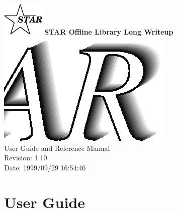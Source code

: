 \documentclass[twoside]{article}
\begin{document}
%
%
\begin{titlepage}
\pagestyle{empty}
\vspace*{-35mm}
\begin{center}
  \mbox{\includegraphics[width=2cm]{StarIcon.eps}}
  {\Large\bf STAR Offline Library Long Writeup}
  \hfill\mbox{}\\[3cm]
  \mbox{\includegraphics[width=\textwidth]{StarClassLibraryTitle.eps}}
  \hfill\mbox{}\\[3cm]
  {\LARGE User Guide and Reference Manual}\\[2cm]
  {\LARGE $ $Revision: 1.10 $ $}  \\[5mm] %
  {\LARGE $ $Date: 1999/09/29 16:54:46 $ $}  %
  \vfill
\end{center}
\cleardoublepage
\end{titlepage}

%
%
\tableofcontents
\cleardoublepage

%
%
\part{User Guide}
\clearpage
\end{document}
